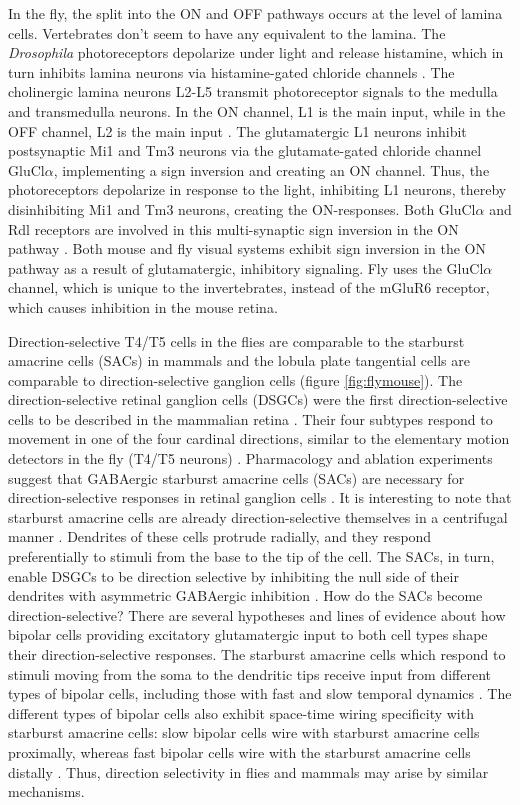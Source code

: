 In the fly, the split into the ON and OFF pathways occurs at the level of lamina cells. Vertebrates don't seem to have any equivalent to the lamina. The \textit{Drosophila} photoreceptors depolarize under light and release histamine, which in turn inhibits lamina neurons via histamine-gated chloride channels \parencite{Hardie1989}. The cholinergic lamina neurons L2-L5 transmit photoreceptor signals to the medulla and transmedulla neurons. In the ON channel, L1 is the main input, while in the OFF channel, L2 is the main input \parencite{Joesch2010}. The glutamatergic L1 neurons inhibit postsynaptic Mi1 and Tm3 neurons via the glutamate-gated chloride channel GluCl$\alpha$, implementing a sign inversion and creating an ON channel. Thus, the photoreceptors depolarize in response to the light, inhibiting L1 neurons, thereby disinhibiting Mi1 and Tm3 neurons, creating the ON-responses. Both GluCl$\alpha$ and Rdl receptors are involved in this multi-synaptic sign inversion in the ON pathway \parencite{Molina2019}. Both mouse and fly visual systems exhibit sign inversion in the ON pathway as a result of glutamatergic, inhibitory signaling. Fly uses the GluCl$\alpha$ channel, which is unique to the invertebrates, instead of the mGluR6 receptor, which causes inhibition in the mouse retina.

Direction-selective T4/T5 cells in the flies are comparable to the starburst amacrine cells (SACs) in mammals and the lobula plate tangential cells are comparable to direction-selective ganglion cells (figure \ref{fig:flymouse}). The direction-selective retinal ganglion cells (DSGCs) were the first direction-selective cells to be described in the mammalian retina \parencite{Barlow1963}. Their four subtypes respond to movement in one of the four cardinal directions, similar to the elementary motion detectors in the fly (T4/T5 neurons) \parencite{Elstrott2008}. Pharmacology and ablation experiments suggest that GABAergic starburst amacrine cells (SACs) are necessary for direction-selective responses in retinal ganglion cells \parencite{Yoshida2001}. It is interesting to note that starburst amacrine cells are already direction-selective themselves in a centrifugal manner \parencite{Euler2002}. Dendrites of these cells protrude radially, and they respond preferentially to stimuli from the base to the tip of the cell. The SACs, in turn, enable DSGCs to be direction selective by inhibiting the null side of their dendrites with asymmetric GABAergic inhibition \parencite{Briggman2011}. How do the SACs become direction-selective? There are several hypotheses and lines of evidence about how bipolar cells providing excitatory glutamatergic input to both cell types shape their direction-selective responses. The starburst amacrine cells which respond to stimuli moving from the soma to the dendritic tips receive input from different types of bipolar cells, including those with fast and slow temporal dynamics \parencite{Baden2013}. The different types of bipolar cells also exhibit space-time wiring specificity with starburst amacrine cells: slow bipolar cells wire with starburst amacrine cells proximally, whereas fast bipolar cells wire with the starburst amacrine cells distally \parencite{Kim2014}. Thus, direction selectivity in flies and mammals may arise by similar mechanisms.

